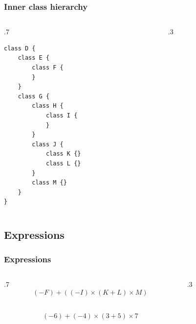 \documentclass[10pt]{beamer}
\begin{document}
\begin{frame}[t,fragile] \frametitle{Inner class hierarchy}
	\begin{columns}[T] %
	\begin{column}{.7\linewidth} %
{\footnotesize 	
\begin{Verbatim}[tabsize=4]
class D {
	class E {
		class F {
		}
	}
	class G {
		class H {
			class I {
			}
		}
		class J {
			class K {}
			class L {}
		}
		class M {}
	}
}
\end{Verbatim}
}
	\end{column} %
	\begin{column}{.3\linewidth} %
		
	\end{column} %
	\end{columns} %
\end{frame}




\subsection{Expressions}
\begin{frame}[t,fragile] \frametitle{Expressions}
	\begin{columns}[T] %
	\begin{column}{.7\linewidth} %
		\[
			(-F) + ( (-I) \times (K + L) \times M)
		\]
		{\center
		\\
		
		\[(-6) + (-4) \times (3 + 5) \times 7\]
		} %
	
	\end{column} %
	\begin{column}{.3\linewidth} %
		
	\end{column} %
	\end{columns} %
\end{frame}
\end{document}
